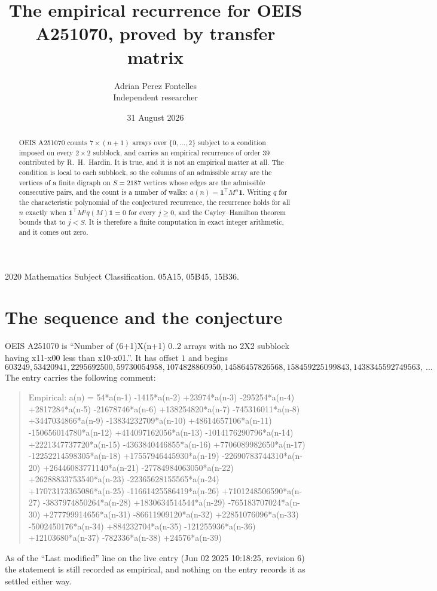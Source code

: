 \documentclass[11pt,a4paper]{article}
\title{The empirical recurrence for OEIS A251070, proved by transfer matrix}
\author{Adrian Perez Fontelles\\ \small Independent researcher}
\date{31 August 2026}
\theoremstyle{plain}
\theoremstyle{definition}
\begin{document}
\maketitle

\begin{abstract}
OEIS A251070 counts $7\times(n+1)$ arrays over $\{0,\dots,2\}$ subject to a condition imposed on
every $2\times2$ subblock, and carries an empirical recurrence of order $39$ contributed
by R.~H.~Hardin. It is true, and it is not an empirical matter at all. The condition is local
to each subblock, so the columns of an admissible array are the vertices of a finite digraph
on $S=2187$ vertices whose edges are the admissible consecutive pairs, and the count is a
number of walks: $a(n)=\mathbf{1}^{\!\top}M^{n}\mathbf{1}$. Writing $q$
for the characteristic polynomial of the conjectured recurrence, the recurrence holds for all
$n$ exactly when $\mathbf{1}^{\!\top}M^{j}q(M)\mathbf{1}=0$ for every $j\ge0$, and the
Cayley--Hamilton theorem bounds that to $j<S$. It is therefore a finite computation in exact
integer arithmetic, and it comes out zero.
\end{abstract}

\noindent\small 2020 Mathematics Subject Classification. 05A15, 05B45, 15B36.\normalsize

\section{The sequence and the conjecture}

OEIS A251070 is ``Number of (6+1)X(n+1) 0..2 arrays with no 2X2 subblock having x11-x00 less than x10-x01.''. It has offset $1$ and begins
\[
603249, 53420941, 2295692500, 59730054958, 1074828860950, 14586457826568, 158459225199843, 1438345592749563,\ \dots
\]
The entry carries the following comment:
\begin{quote}\small
Empirical: a(n) = 54*a(n-1) -1415*a(n-2) +23974*a(n-3) -295254*a(n-4) +2817284*a(n-5) -21678746*a(n-6) +138254820*a(n-7) -745316011*a(n-8) +3447034866*a(n-9) -13834232709*a(n-10) +48614657106*a(n-11) -150656014780*a(n-12) +414097162056*a(n-13) -1014176290796*a(n-14) +2221347737720*a(n-15) -4363840446855*a(n-16) +7706089982650*a(n-17) -12252214598305*a(n-18) +17557946445930*a(n-19) -22690783744310*a(n-20) +26446083771140*a(n-21) -27784984063050*a(n-22) +26288833753540*a(n-23) -22365628155565*a(n-24) +17073173365086*a(n-25) -11661425586419*a(n-26) +7101248506590*a(n-27) -3837974850264*a(n-28) +1830634514544*a(n-29) -765183707024*a(n-30) +277799914656*a(n-31) -86611909120*a(n-32) +22851076096*a(n-33) -5002450176*a(n-34) +884232704*a(n-35) -121255936*a(n-36) +12103680*a(n-37) -782336*a(n-38) +24576*a(n-39)
\end{quote}
As of the ``Last modified'' line on the live entry (Jun 02 2025 10:18:25, revision 6) the statement is
still recorded as empirical, and nothing on the entry records it as settled either way.
\end{document}
